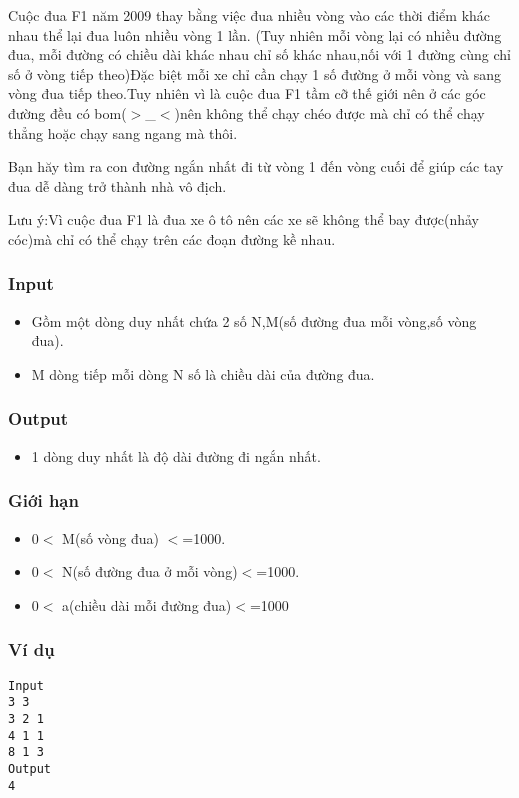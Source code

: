 



   Cuộc đua F1 năm 2009 thay bằng việc đua nhiều vòng vào các thời điểm khác nhau thể lại đua luôn nhiều vòng 1 lần. (Tuy nhiên mỗi vòng lại có nhiều đường đua, mỗi đường có chiều dài khác nhau chỉ số khác nhau,nối với 1 đường cùng chỉ số ở vòng tiếp theo)Đặc biệt mỗi xe chỉ cần chạy 1 số đường ở mỗi vòng và sang vòng đua tiếp theo.Tuy nhiên vì là cuộc đua F1 tầm cỡ thế giới nên ở các góc đường đều có bom($>$\_$<$)nên không thể chạy chéo được mà chỉ có thể chạy thẳng hoặc chạy sang ngang mà thôi.  

   Bạn hăy tìm ra con đường ngắn nhất đi từ vòng 1 đến vòng cuối để giúp các tay đua dễ dàng trở thành nhà vô địch.  

   Lưu ý:Vì cuộc đua F1 là đua xe ô tô nên các xe sẽ không thể bay được(nhảy cóc)mà chỉ có thể chạy trên các đoạn đường kề nhau.  

\subsubsection{   Input  }
\begin{itemize}
	\item     Gồm một dòng duy nhất chứa 2 số N,M(số đường đua mỗi vòng,số vòng đua).   
	\item     M dòng tiếp mỗi dòng N số là chiều dài của đường đua.   
\end{itemize}

\subsubsection{   Output  }
\begin{itemize}
	\item     1 dòng duy nhất là độ dài đường đi ngắn nhất.   
\end{itemize}

\subsubsection{   Giới hạn  }
\begin{itemize}
	\item     0$<$ M(số vòng đua) $<$=1000.   
	\item     0$<$ N(số đường đua ở mỗi vòng)$<$=1000.   
	\item     0$<$ a(chiều dài mỗi đường đua)$<$=1000   
\end{itemize}

\subsubsection{   Ví dụ  }
\begin{verbatim}
Input
3 3
3 2 1
4 1 1
8 1 3
Output
4
\end{verbatim}